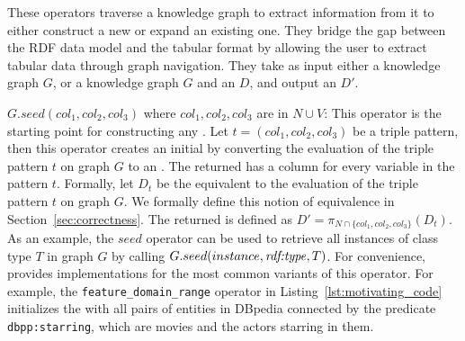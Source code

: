 These operators traverse a knowledge graph to extract information from it to either construct a new \rdfframe or expand an existing one. 
They bridge the gap between the RDF data model and the tabular format by allowing the user to extract tabular data through graph navigation.
They take as input either a knowledge graph $G$, or a knowledge graph $G$ and an \rdfframe $D$, and output an \rdfframe $D'$. 
\squishlist
\begin{sloppypar}
    \item $G.seed(col_1, col_2, col_3)$ where $col_1, col_2, col_3$ are in $N \cup V$: This operator is the starting point for constructing any \rdfframe. 
    Let $t = (col_1, col_2, col_3)$ be a \sparql triple pattern, then this operator creates an initial \rdfframe by converting the evaluation of the  triple pattern $t$ on graph $G$ to an \rdfframe. The returned \rdfframe has a column for every variable in the pattern $t$.
    Formally, let $D_t$ be the \rdfframe equivalent to the evaluation of the triple pattern $t$ on graph $G$. We formally define this notion of equivalence in Section~\ref{sec:correctness}.
	 The returned \rdfframe is defined as $D' = \pi_{N \cap \{col_1, col_2, col_3\}}(D_t)$.
	 As an example, the $seed$ operator can be used to retrieve all instances of class type $T$
	 in graph $G$ by calling $G.seed(instance, \text{\textit{rdf:type}}, T)$. 
	 For convenience, \rdfframes provides implementations for 
   the most common variants of this operator.
	 For example, the \texttt{feature\_domain\_range} operator in Listing~\ref{lst:motivating_code} initializes the \rdfframe with all pairs of entities in DBpedia connected by the predicate \texttt{dbpp:starring},
   which are movies and
	 the
	 actors starring in them.


\end{sloppypar}
